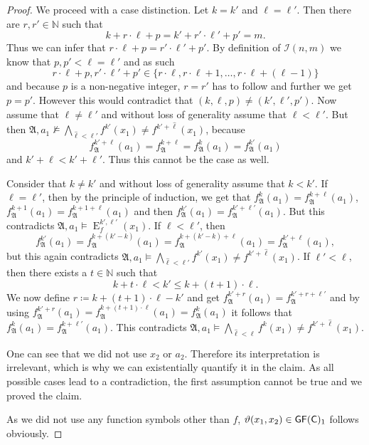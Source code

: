\begin{proof}
	We proceed with a case distinction. 
	Let $k=k'$ and $\ell=\ell'$.
	Then there are $r,r'\in\mathbb N$ such that
	$$k+r\cdot \ell + p = k'+r'\cdot \ell' + p'=m.$$
	Thus we can infer that $r\cdot \ell+p = r'\cdot \ell'+p'$.
	By definition of $\mathcal{I}(n,m)$ we know that $p,p'<\ell=\ell'$ and as such 
	$$r\cdot \ell +p,r'\cdot \ell'+p'\in \{r\cdot \ell,r\cdot \ell +1,\dots, r\cdot \ell +(\ell-1)\}$$
	and because $p$ is a non-negative integer, $r=r'$ has to follow and further we get $p=p'$.
	However this would contradict that $(k,\ell,p)\neq (k',\ell',p')$.
	Now assume that $\ell\neq\ell'$ and without loss of generality assume that $\ell<\ell'$.
	But then $\mathfrak A,a_1 \not\models \bigwedge_{\hat{\ell}<\ell'}f^{k'}(x_1)\neq f^{k'+\hat{\ell}}(x_1)$, because 
	$$f^{k'+\ell}_{\mathfrak A}(a_1)=f^{k+\ell}_{\mathfrak A}=f^k_{\mathfrak A}(a_1)=f^{k'}_{\mathfrak A}(a_1)$$
	and $k'+\ell < k'+\ell'$.
	Thus this cannot be the case as well.
	
	Consider that $k\neq k'$ and without loss of generality assume that $k<k'$.
	If $\ell=\ell'$, then by the principle of induction, we get that $f_{\mathfrak A}^k(a_1)=f_{\mathfrak A}^{k+\ell}(a_1)$, $f_{\mathfrak A}^{k+1}(a_1)=f_{\mathfrak A}^{k+1+\ell}(a_1)$ and then $f_{\mathfrak A}^{k'}(a_1)=f_{\mathfrak A}^{k'+\ell'}(a_1)$.
	But this contradicts $\mathfrak A,a_1 \models \operatorname{E}^{k',\ell'}_f(x_1)$.
	If $\ell < \ell'$, then 
	$$f_{\mathfrak A}^{k'}(a_1) =f_{\mathfrak A}^{k+(k'-k)}(a_1)=f_{\mathfrak A}^{k+(k'-k)+\ell}(a_1) = f_{\mathfrak A}^{k'+\ell}(a_1),$$
	but this again contradicts $\mathfrak A,a_1 \models \bigwedge_{\hat{\ell}<\ell'}f^{k'}(x_1)\neq f^{k'+\hat{\ell}}(x_1)$.
	If $\ell'<\ell$, then there exists a $t\in\mathbb N$ such that 
	$$k+t\cdot  \ell < k' \leq k+(t+1)\cdot \ell.$$
	We now define $r\coloneqq k+(t+1)\cdot \ell -k'$ and get $f_{\mathfrak A}^{k'+r}(a_1)=f_{\mathfrak A}^{k'+r+\ell'}$ and by using $f_{\mathfrak A}^{k'+r}(a_1)=f_{\mathfrak A}^{k+(t+1)\cdot \ell}(a_1)=f_{\mathfrak A}^k(a_1)$ it follows that $f_{\mathfrak A}^{k}(a_1)=f_{\mathfrak A}^{k+\ell'}(a_1)$.
	This contradicts $\mathfrak A,a_1 \models \bigwedge_{\hat{\ell}<\ell}f^{k}(x_1)\neq f^{k'+\hat{\ell}}(x_1)$.
	
	One can see that we did not use $x_2$ or $a_2$.
	Therefore its interpretation is irrelevant, which is why we can existentially quantify it in the claim.
	As all possible cases lead to a contradiction, the first assumption cannot be true and we proved the claim.
	
	As we did not use any function symbols other than $f$, $\vartheta(x_1,x_2)\in \mathsf{GF}(\mathsf{C})_1$ follows obviously.
\end{proof}

